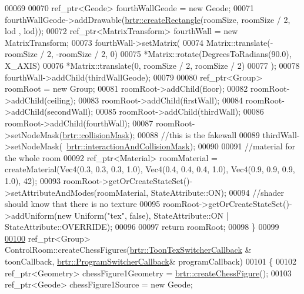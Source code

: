 \begin{DoxyCode}
00069 
00070         ref\_ptr<Geode> fourthWallGeode = \textcolor{keyword}{new} Geode;
00071         fourthWallGeode->addDrawable(\hyperlink{namespacebrtr_a793c6ef7f57632fc5ac280b94f60dd65}{brtr::createRectangle}(roomSize, roomSize / 2, lod
      , lod));
00072         ref\_ptr<MatrixTransform> fourthWall = \textcolor{keyword}{new} MatrixTransform;
00073         fourthWall->setMatrix(
00074             Matrix::translate(-roomSize / 2, -roomSize / 2, 0)
00075             *Matrix::rotate(DegreesToRadians(90.0), X\_AXIS)
00076             *Matrix::translate(0, roomSize / 2, roomSize / 2)
00077             );
00078         fourthWall->addChild(thirdWallGeode);
00079 
00080         ref\_ptr<Group> roomRoot = \textcolor{keyword}{new} Group;
00081         roomRoot->addChild(floor);
00082         roomRoot->addChild(ceiling);
00083         roomRoot->addChild(firstWall);
00084         roomRoot->addChild(secondWall);
00085         roomRoot->addChild(thirdWall);
00086         roomRoot->addChild(fourthWall);
00087         roomRoot->setNodeMask(\hyperlink{namespacebrtr_af79a815819e2ef65ea9cd43dc9d43679}{brtr::collisionMask});
00088         \textcolor{comment}{//this is the fakewall}
00089         thirdWall->setNodeMask(~\hyperlink{namespacebrtr_a21ab851f18c0c85fa006766034833a4f}{brtr::interactionAndCollisionMask});
00090 
00091         \textcolor{comment}{//material for the whole room}
00092         ref\_ptr<Material> roomMaterial = createMaterial(Vec4(0.3, 0.3, 0.3, 1.0), Vec4(0.4, 0.4, 0.4, 1.0),
       Vec4(0.9, 0.9, 0.9, 1.0), 42);     
00093         roomRoot->getOrCreateStateSet()->setAttributeAndModes(roomMaterial, StateAttribute::ON);
00094         \textcolor{comment}{//shader should know that there is no texture}
00095         roomRoot->getOrCreateStateSet()->addUniform(\textcolor{keyword}{new} Uniform(\textcolor{stringliteral}{"tex"}, \textcolor{keyword}{false}), StateAttribute::ON | 
      StateAttribute::OVERRIDE);
00096 
00097         \textcolor{keywordflow}{return} roomRoot;
00098     \}
00099 
\hypertarget{_control_room_8cpp_source_l00100}{}\hyperlink{classbrtr_1_1_control_room_a15055ae530b811b7046871c5c1ef3f4f}{00100}     ref\_ptr<Group> ControlRoom::createChessFigures(\hyperlink{classbrtr_1_1_toon_tex_switcher_callback}{brtr::ToonTexSwitcherCallback}
      & toonCallback, \hyperlink{classbrtr_1_1_program_switcher_callback}{brtr::ProgramSwitcherCallback}& programCallback)
00101 \{
00102         ref\_ptr<Geometry> chessFigure1Geometry = \hyperlink{namespacebrtr_a118d4013732dea1a161b6d225df6dc2e}{brtr::createChessFigure}();
00103         ref\_ptr<Geode> chessFigure1Source = \textcolor{keyword}{new} Geode;

\end{DoxyCode}
